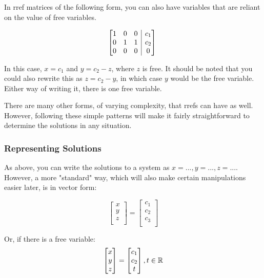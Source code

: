 \documentclass[12pt]{article}
\begin{document}
\begin{itemize}
    In rref matrices of the following form, you can also have variables that are reliant on the value of free variables. 
     
     $$
    \begin{array}[t][{@{}ccc|c@{}}]
     1 & 0 & 0 & c_1 \\
     0 & 1 & 1 & c_2 \\
     0 & 0 & 0 & 0 \\
    \end{array}\
    $$
    
    In this case, $x = c_1$ and $y = c_2 - z$, where $z$ is free. It should be noted that you could also rewrite this as $z = c_2 - y$, in which case $y$ would be the free variable. Either way of writing it, there is one free variable.
\end{itemize}

There are many other forms, of varying complexity, that rrefs can have as well. However, following these simple patterns will make it fairly straightforward to determine the solutions in any situation.

\subsubsection{Representing Solutions}

As above, you can write the solutions to a system as $x = ..., y = ..., z = ...$. However, a more "standard" way, which will also make certain manipulations easier later, is in vector form:

\[
    \begin{bmatrix}
     x \\
     y \\
     z \\
    \end{bmatrix} 
    = 
    \begin{bmatrix}
     c_1 \\
     c_2 \\
     c_3 \\
    \end{bmatrix}
\]

Or, if there is a free variable: 
\[
    \begin{bmatrix}
    x \\
    y \\ 
    z \\
    \end{bmatrix}
    = 
    \begin{bmatrix}
    c_1 \\
    c_2 \\
    t \\
    \end{bmatrix}
    , t \in \mathbb{R}
\]
\end{document}
